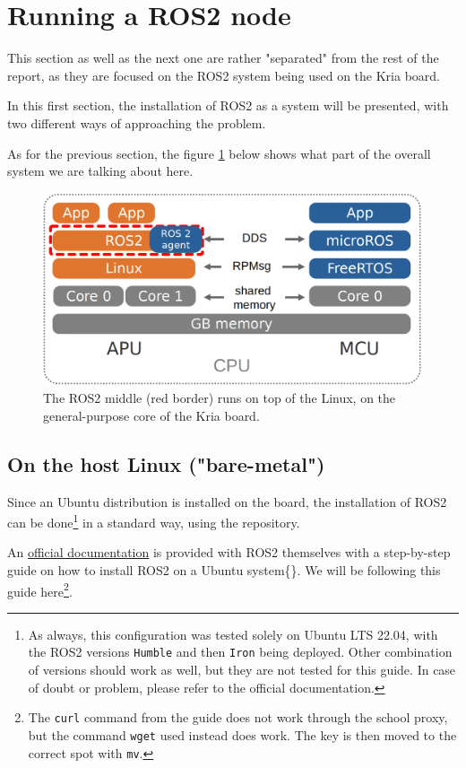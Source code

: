 \documentclass[10pt]{article}
\begin{document}
\section{Running a ROS2 node}
\label{sec:orgbc5dca3}
This section as well as the next one are rather "separated" from the rest of the report, as
they are focused on the ROS2 system being used on the Kria board.

In this first section, the installation of ROS2 as a system will be presented, with
two different ways of approaching the problem.

As for the previous section, the figure \ref{fig:org9fb8465} below shows what part
of the overall system we are talking about here.

\begin{figure}[htbp]
\centering
\includegraphics[width=.6\textwidth]{./img/map_ros.png}
\caption{\label{fig:org9fb8465}The ROS2 middle (red border) runs on top of the Linux, on the general-purpose core of the Kria board.}
\end{figure}

\subsection{On the host Linux ("bare-metal")}
\label{sec:orgb87efc8}
Since an Ubuntu distribution is installed on the board, the installation of ROS2
can be done\footnote{As always, this configuration was tested solely on Ubuntu LTS 22.04,
with the ROS2 versions \texttt{Humble} and then \texttt{Iron} being deployed.
Other combination of versions should work as well, but they are not
tested for this guide. In case of doubt or problem, please refer to the official documentation.} in a standard way, using the repository.

An \href{https://docs.ros.org/en/humble/Installation/Ubuntu-Install-Debians.html}{official documentation} is provided with ROS2 themselves with a step-by-step guide on how to install
ROS2 on a Ubuntu system\{\}.
We will be following this guide here\footnote{The \texttt{curl} command from the guide does not work through the school proxy,
but the command \texttt{wget} used instead does work. The key is then moved to the correct spot with \texttt{mv}.}.
\end{document}
